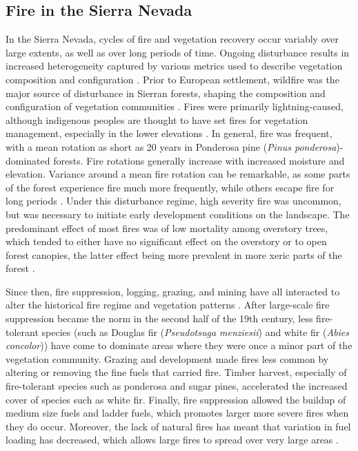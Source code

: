 \subsection{Fire in the Sierra Nevada}
In the Sierra Nevada, cycles of fire and vegetation recovery occur variably over large extents, as well as over long periods of time. Ongoing disturbance results in increased heterogeneity captured by various metrics used to describe vegetation composition and configuration \citep{Monica2008}. Prior to European settlement, wildfire was the major source of disturbance in Sierran forests, shaping the composition and configuration of vegetation communities \citep{SNEP1996a}. Fires were primarily lightning-caused, although indigenous peoples are thought to have set fires for vegetation management, especially in the lower elevations \citep{Anderson1996}. In general, fire was frequent, with a mean rotation as short as 20 years in Ponderosa pine (\emph{Pinus ponderosa})-dominated forests. Fire rotations generally increase with increased moisture and elevation. Variance around a mean fire rotation can be remarkable, as some parts of the forest experience fire much more frequently, while others escape fire for long periods \citep{Mallek2013}. Under this disturbance regime, high severity fire was uncommon, but was necessary to initiate early development conditions on the landscape. The predominant effect of most fires was of low mortality among overstory trees, which tended to either have no significant effect on the overstory or to open forest canopies, the latter effect being more prevalent in more xeric parts of the forest \citep{Skinner1996,Safford2014,SNEP1996,SNEP1996a}.

Since then, fire suppression, logging, grazing, and mining have all interacted to alter the historical fire regime and vegetation patterns \citep{Stephens2015,Knapp2013}. After large-scale fire suppression became the norm in the second half of the 19th century, less fire-tolerant species (such as Douglas fir (\emph{Pseudotsuga menziesii}) and white fir (\emph{Abies concolor})) have come to dominate areas where they were once a minor part of the vegetation community. Grazing and development made fires less common by altering or removing the fine fuels that carried fire. Timber harvest, especially of fire-tolerant species such as ponderosa and sugar pines, accelerated the increased cover of species such as white fir. Finally, fire suppression allowed the buildup of medium size fuels and ladder fuels, which promotes larger more severe fires when they do occur. Moreover, the lack of natural fires has meant that variation in fuel loading has decreased, which allows large fires to spread over very large areas \citep{Hessburg2005,Beaty2007,Meyer2008}.



